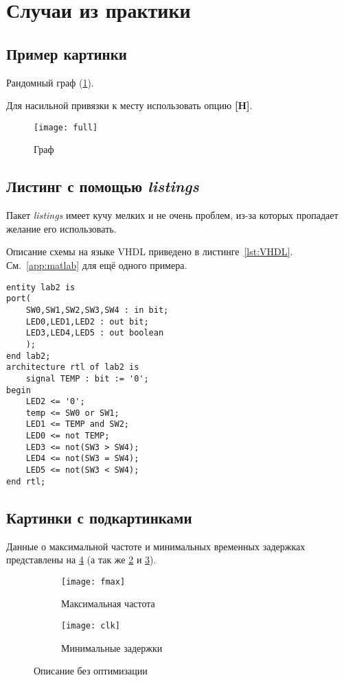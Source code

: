 \section{Случаи из практики}

\subsection{Пример картинки}

Рандомный граф (\ref{pic:graph}). 

Для насильной привязки к месту использовать опцию \textbf{[H]}. \cite{float}

\begin{figure}[H]
	\centering
	\texttt{[image: full]}
	\caption{Граф}
	\label{pic:graph}
\end{figure}

\subsection{Листинг с помощью \emph{listings}}

Пакет \emph{listings} имеет кучу мелких и не очень проблем, из-за которых пропадает желание его использовать.

Описание схемы на языке VHDL приведено в листинге~\ref{lst:VHDL}.
См.~\ref{app:matlab} для ещё одного примера.

\lstset{style=vhdl}
\begin{lstlisting}[label=lst:VHDL,caption=Описание схемы]
entity lab2 is
port(
	SW0,SW1,SW2,SW3,SW4 : in bit;
	LED0,LED1,LED2 : out bit;
	LED3,LED4,LED5 : out boolean
	);
end lab2;
architecture rtl of lab2 is
	signal TEMP : bit := '0';
begin
	LED2 <= '0';
	temp <= SW0 or SW1;
	LED1 <= TEMP and SW2;
	LED0 <= not TEMP;
	LED3 <= not(SW3 > SW4);
	LED4 <= not(SW3 = SW4);
	LED5 <= not(SW3 < SW4);
end rtl;
\end{lstlisting}

\subsection{Картинки с подкартинками}

Данные о максимальной частоте и минимальных временных задержках представлены на \ref{pic:base} (а так же \ref{pic:fmax} и \ref{pic:clk}). \cite{subcap}

\begin{figure}[H]
	\begin{subfigure}{.4\linewidth}
		\centering
		\texttt{[image: fmax]}
		\caption{Максимальная частота}
		\label{pic:fmax}
	\end{subfigure}
	\begin{subfigure}{.6\linewidth}
		\centering
		\texttt{[image: clk]}
		\caption{Минимальные задержки}
		\label{pic:clk}
	\end{subfigure}
\caption{Описание без оптимизации}
\label{pic:base}
\end{figure}

